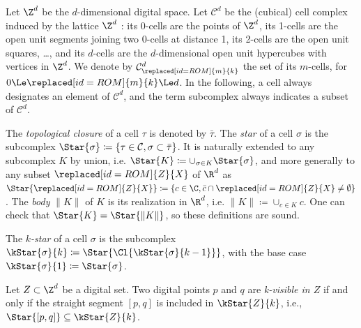     Let $\Z^d$ be the $d$-dimensional
    digital space.  Let $\mathcal{C}^d$ be the (cubical) cell complex
    induced by the lattice $\Z^d$ : its 0-cells are the points of
    $\Z^d$, its 1-cells are the open unit segments joining two 0-cells
    at distance 1, its 2-cells are the open unit squares, \ldots, and
    its $d$-cells are the $d$-dimensional open unit hypercubes with
    vertices in $\Z^d$.  We denote by $\mathcal{C}^d_{\replaced[id=ROM]{m}{k}}$ the set of its
    $m$-cells, for $0 \Le \replaced[id=ROM]{m}{k} \Le d$.  In the following, a cell always
    designates an element of $\mathcal{C}^d$, and the term subcomplex
    always indicates a subset of $\mathcal{C}^d$.

     The \emph{topological closure} of a cell $\tau$ is denoted by
    $\bar{\tau}$. The \emph{star} of a cell $\sigma$ is the subcomplex
    $\Star{\sigma}\coloneqq\{\tau \in \mathcal{C}, \sigma \subset \bar{\tau}
    \}$. It is naturally extended to any subcomplex $K$ by union,
    i.e. $\Star{K} \coloneqq \cup_{\sigma \in K} \Star{\sigma}$, and more
    generally to any subset $\replaced[id=ROM]{Z}{X}$ of $\R^d$ as $\Star{\replaced[id=ROM]{Z}{X}}\coloneqq\{ c \in \C,
    \bar{c} \cap \replaced[id=ROM]{Z}{X} \neq \emptyset \}$. The \emph{body} $\|K\|$ of $K$
    is its realization in $\R^d$, i.e. $\|K\|\coloneqq\cup_{c \in K} c$. One
    can check that $\Star{K}=\Star{\|K\|}$, so these definitions are
    sound.

    The \emph{$k$-star} of a cell $\sigma$ is the subcomplex
    $\kStar{\sigma}{k} \coloneqq \Star{\Cl{\kStar{\sigma}{k-1}}}$, with the base case
    $\kStar{\sigma}{1} \coloneqq \Star{\sigma}$.

    \begin{definition}[k-Visibility]
      Let $Z \subset \Z^d$ be a digital set. Two digital points $p$
      and $q$ are \emph{k-visible in $Z$} if and only if the straight
      segment $[p, q]$ is included in $\kStar{Z}{k}$, i.e., $\Star{[p, q]}
      \subseteq \kStar{Z}{k}$.
    \end{definition}

